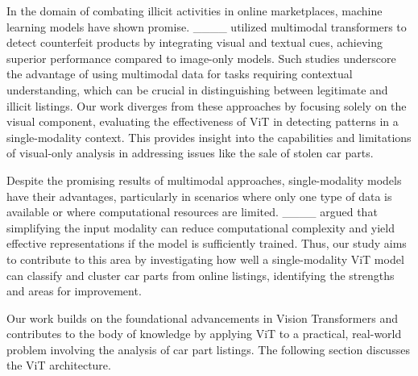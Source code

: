 In the domain of combating illicit activities in online marketplaces, machine learning models have shown promise. ____ utilized multimodal transformers to detect counterfeit products by integrating visual and textual cues, achieving superior performance compared to image-only models. Such studies underscore the advantage of using multimodal data for tasks requiring contextual understanding, which can be crucial in distinguishing between legitimate and illicit listings. Our work diverges from these approaches by focusing solely on the visual component, evaluating the effectiveness of ViT in detecting patterns in a single-modality context. This provides insight into the capabilities and limitations of visual-only analysis in addressing issues like the sale of stolen car parts.

Despite the promising results of multimodal approaches, single-modality models have their advantages, particularly in scenarios where only one type of data is available or where computational resources are limited. ____ argued that simplifying the input modality can reduce computational complexity and yield effective representations if the model is sufficiently trained. Thus, our study aims to contribute to this area by investigating how well a single-modality ViT model can classify and cluster car parts from online listings, identifying the strengths and areas for improvement.

Our work builds on the foundational advancements in Vision Transformers and contributes to the body of knowledge by applying ViT to a practical, real-world problem involving the analysis of car part listings. The following section discusses the ViT architecture.